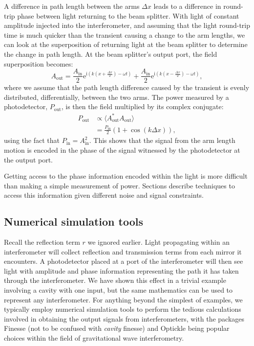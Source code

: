 A difference in path length between the arms $\Delta x$ leads to a difference in round-trip phase between light returning to the beam splitter. With light of constant amplitude injected into the interferometer, and assuming that the light round-trip time is much quicker than the transient causing a change to the arm lengths, we can look at the superposition of returning light at the beam splitter to determine the change in path length. At the beam splitter's output port, the field superposition becomes:
\begin{equation}
  A_{\text{out}} = \frac{A_{\text{in}}}{2} \text{e}^{\text{i} \left( k \left( x + \frac{\Delta x}{2} \right) - \omega t \right)} + \frac{A_{\text{in}}}{2} \text{e}^{\text{i} \left( k \left( x - \frac{\Delta x}{2} \right) - \omega t \right)},
\end{equation}
where we assume that the path length difference caused by the transient is evenly distributed, differentially, between the two arms. The power measured by a photodetector, $P_{\text{out}}$, is then the field multiplied by its complex conjugate:
\begin{equation}
  \label{eq:mich-p-out}
  \begin{split}
    P_{\text{out}} &\propto \langle A_{\text{out}}^*A_{\text{out}} \rangle \\
                   &= \frac{P_{\text{in}}}{2} \left( 1 + \cos \left( k \Delta x \right) \right),
  \end{split}
\end{equation}
using the fact that $P_{\text{in}} = A_{\text{in}}^2$. This shows that the signal from the arm length motion is encoded in the phase of the signal witnessed by the photodetector at the output port.

Getting access to the phase information encoded within the light is more difficult than making a simple measurement of power. Sections  describe techniques to access this information given different noise and signal constraints.


\subsection{Numerical simulation tools}
Recall the reflection term $r$ we ignored earlier. Light propagating within an interferometer will collect reflection and transmission terms from each mirror it encounters. A photodetector placed at a port of the interferometer will then see light with amplitude and phase information representing the path it has taken through the interferometer. We have shown this effect in a trivial example involving a \FP{} cavity with one input, but the same mathematics can be used to represent any interferometer. For anything beyond the simplest of examples, we typically employ numerical simulation tools to perform the tedious calculations involved in obtaining the output signals from interferometers, with the packages Finesse \cite{Freise2004} (not to be confused with \emph{cavity} finesse) and Optickle \cite{Evans2012} being popular choices within the field of gravitational wave interferometry.

